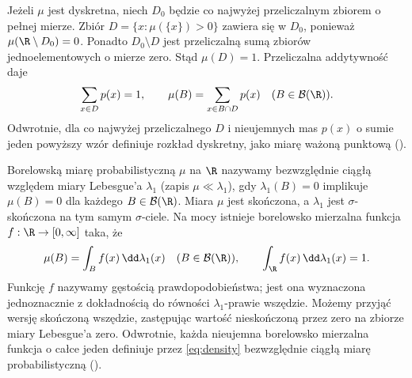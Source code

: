 Jeżeli $\mu$ jest dyskretna, niech $D_0$ będzie co najwyżej
przeliczalnym zbiorem o pełnej mierze. Zbiór
$D=\{x:\mu(\{x\})>0\}$ zawiera się w $D_0$, ponieważ
$\mu(\R\setminus D_0)=0$. Ponadto $D_0\setminus D$
jest przeliczalną sumą zbiorów jednoelementowych o mierze zero.
Stąd $\mu(D)=1$. Przeliczalna addytywność daje
\[
\sum_{x\in D}p(x)=1,\qquad
\mu(B)=\sum_{x\in B\cap D}p(x)\quad(B\in\mathcal B(\R)).
\]
Odwrotnie, dla co najwyżej przeliczalnego $D$ i nieujemnych
mas $p(x)$ o sumie jeden powyższy wzór definiuje rozkład
dyskretny, jako miarę ważoną punktową
().

\begin{definicja}
Borelowską miarę probabilistyczną $\mu$ na $\R$ nazywamy
bezwzględnie ciągłą względem miary Lebesgue'a $\lambda_1$
(zapis $\mu\ll\lambda_1$), gdy $\lambda_1(B)=0$ implikuje $\mu(B)=0$ dla każdego
$B\in\mathcal B(\R)$. Miara $\mu$ jest skończona, a
$\lambda_1$ jest $\sigma$-skończona na tym samym $\sigma$-ciele.
Na mocy 
istnieje borelowsko mierzalna funkcja $f:\R\to[0,\infty]$ taka, że
\begin{equation}\label{eq:density}
\mu(B)=\int_B f(x)\,\dd\lambda_1(x)
\quad(B\in\mathcal B(\R)),\qquad
\int_\R f(x)\,\dd\lambda_1(x)=1.
\end{equation}
Funkcję $f$ nazywamy gęstością prawdopodobieństwa; jest ona
wyznaczona jednoznacznie z dokładnością do równości
$\lambda_1$-prawie wszędzie. Możemy przyjąć wersję skończoną
wszędzie, zastępując wartość nieskończoną przez zero na zbiorze
miary Lebesgue'a zero. Odwrotnie, każda nieujemna borelowsko
mierzalna funkcja o całce jeden definiuje przez \eqref{eq:density}
bezwzględnie ciągłą miarę probabilistyczną
().
\end{definicja}

